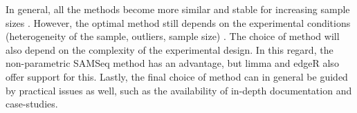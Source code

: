 \documentclass[a4paper,10pt]{article}\usepackage[]{graphicx}\usepackage[]{color}
\begin{document}

In general, all the methods become more similar and stable for increasing sample sizes \autocite{seyednasrollah_comparison_2015}. However, the optimal method still depends on the experimental conditions (heterogeneity of the sample, outliers, sample size) \autocite{soneson_comparison_2013}. The choice of method will also depend on the complexity of the experimental design. In this regard, the non-parametric SAMSeq method has an advantage, but limma and edgeR also offer support for this. Lastly, the final choice of method can in general be guided by practical issues as well, such as the availability of in-depth documentation and case-studies.

\clearpage
\printbibliography

\appendix
\end{document}
